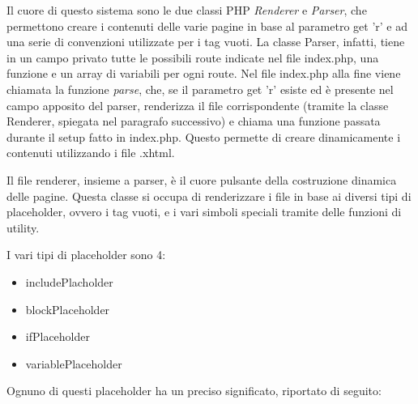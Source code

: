 Il cuore di questo sistema sono le due classi PHP \textit{Renderer} e \textit{Parser}, che permettono creare i contenuti delle varie pagine in base al parametro get 'r' e ad una serie di convenzioni utilizzate per i tag vuoti. La classe Parser, infatti,
tiene in un campo privato tutte le possibili route indicate nel file index.php, una funzione e un array di variabili per ogni route. Nel file index.php alla fine viene chiamata la funzione \textit{parse}, che, se il parametro get 'r' esiste ed è presente nel campo apposito 
del parser, renderizza il file corrispondente (tramite la classe Renderer, spiegata nel paragrafo successivo) e chiama una funzione passata durante il setup fatto in index.php. Questo permette di creare dinamicamente i contenuti utilizzando i file .xhtml.

Il file renderer, insieme a parser, è il cuore pulsante della costruzione dinamica delle pagine. Questa classe si occupa di renderizzare i file in base ai diversi tipi di placeholder, ovvero i tag vuoti, e i vari simboli speciali 
tramite delle funzioni di utility. 


I vari tipi di placeholder sono 4:

\begin{itemize}
    
	\item includePlacholder
    \item blockPlaceholder
	\item ifPlaceholder
	\item variablePlaceholder
	
\end{itemize}

Ognuno di questi placeholder ha un preciso significato, riportato di seguito:

